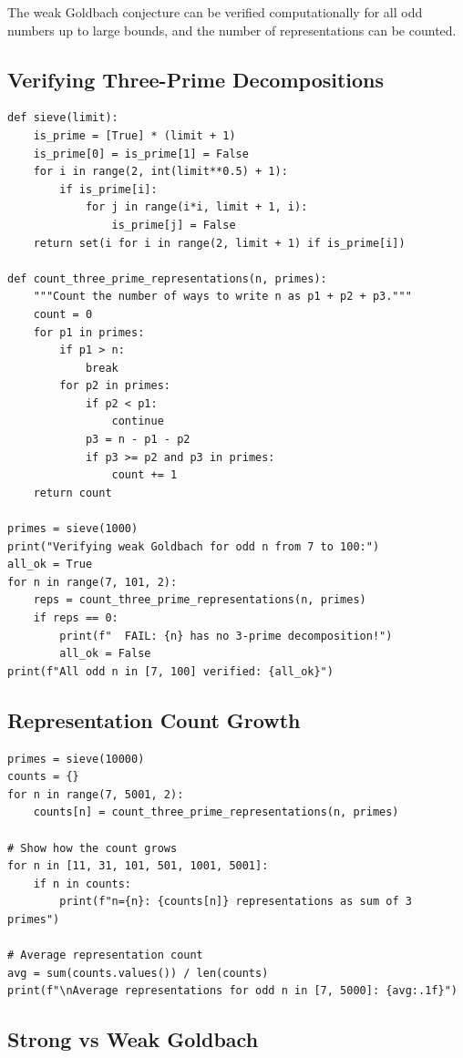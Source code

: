 The weak Goldbach conjecture can be verified computationally for all odd numbers up to large bounds, and the number of representations can be counted.

\subsection{Verifying Three-Prime Decompositions}

\begin{verbatim}
def sieve(limit):
    is_prime = [True] * (limit + 1)
    is_prime[0] = is_prime[1] = False
    for i in range(2, int(limit**0.5) + 1):
        if is_prime[i]:
            for j in range(i*i, limit + 1, i):
                is_prime[j] = False
    return set(i for i in range(2, limit + 1) if is_prime[i])

def count_three_prime_representations(n, primes):
    """Count the number of ways to write n as p1 + p2 + p3."""
    count = 0
    for p1 in primes:
        if p1 > n:
            break
        for p2 in primes:
            if p2 < p1:
                continue
            p3 = n - p1 - p2
            if p3 >= p2 and p3 in primes:
                count += 1
    return count

primes = sieve(1000)
print("Verifying weak Goldbach for odd n from 7 to 100:")
all_ok = True
for n in range(7, 101, 2):
    reps = count_three_prime_representations(n, primes)
    if reps == 0:
        print(f"  FAIL: {n} has no 3-prime decomposition!")
        all_ok = False
print(f"All odd n in [7, 100] verified: {all_ok}")
\end{verbatim}

\subsection{Representation Count Growth}

\begin{verbatim}
primes = sieve(10000)
counts = {}
for n in range(7, 5001, 2):
    counts[n] = count_three_prime_representations(n, primes)

# Show how the count grows
for n in [11, 31, 101, 501, 1001, 5001]:
    if n in counts:
        print(f"n={n}: {counts[n]} representations as sum of 3 primes")

# Average representation count
avg = sum(counts.values()) / len(counts)
print(f"\nAverage representations for odd n in [7, 5000]: {avg:.1f}")
\end{verbatim}

\subsection{Strong vs Weak Goldbach}

